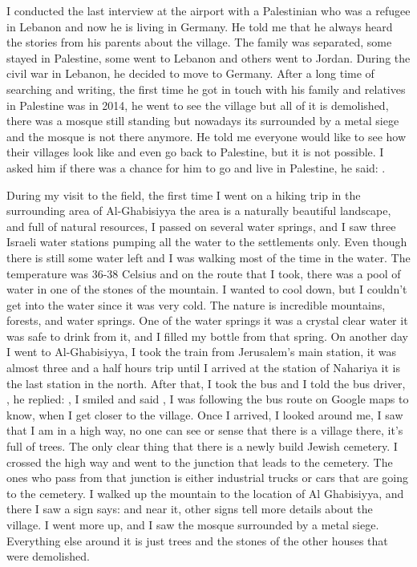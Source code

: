 I conducted the last interview at the airport with a Palestinian who was a refugee in Lebanon and now he is living in Germany. He told me that he always heard the stories from his parents about the village. The family was separated, some stayed in Palestine, some went to Lebanon and others went to Jordan. During the civil war in Lebanon, he decided to move to Germany. After a long time of searching and writing, the first time he got in touch with his family and relatives in Palestine was in 2014, he went to see the village but all of it is demolished, there was a mosque still standing but nowadays its surrounded by a metal siege and the mosque is not there anymore. He told me everyone would like to see how their villages look like and even go back to Palestine, but it is not possible.  I asked him if there was a chance for him to go and live in Palestine, he said: .

During my visit to the field, the first time I went on a hiking trip in the surrounding area of Al-Ghabisiyya the area is a naturally beautiful landscape, and full of natural resources, I passed on several water springs, and I saw three Israeli water stations pumping all the water to the settlements only. Even though there is still some water left and I was walking most of the time in the water. The temperature was 36-38 Celsius and on the route that I took, there was a pool of water in one of the stones of the mountain. I wanted to cool down, but I couldn't get into the water since it was very cold. The nature is incredible mountains, forests, and water springs. One of the water springs it was a crystal clear water it was safe to drink from it, and I filled my bottle from that spring. On another day I went to Al-Ghabisiyya, I took the train from Jerusalem's main station, it was almost three and a half hours trip until I arrived at the station of Nahariya it is the last station in the north.  After that, I took the bus and I told the bus driver, , he replied: , I smiled and said , I was following the bus route on Google maps to know, when I get closer to the village. Once I arrived, I looked around me, I saw that I am in a high way, no one can see or sense that there is a village there, it's full of trees. The only clear thing that there is a newly build Jewish cemetery. I crossed the high way and went to the junction that leads to the cemetery. The ones who pass from that junction is either industrial trucks or cars that are going to the cemetery. I walked up the mountain to the location of Al Ghabisiyya, and there I saw a sign says:  and near it, other signs tell more details about the village. I went more up, and I saw the mosque surrounded by a metal siege. Everything else around it is just trees and the stones of the other houses that were demolished. 

